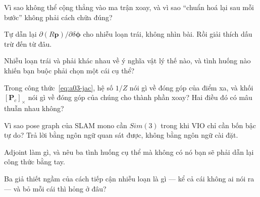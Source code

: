 \documentclass[../../vslam.tex]{subfiles}
\begin{document}
\begin{tukiem}
\item Vì sao không thể cộng thẳng vào ma trận xoay, và vì sao ``chuẩn hoá lại sau mỗi bước'' không phải cách chữa đúng?
\item Tự dẫn lại \(\partial(R\mathbf{p})/\partial\delta\boldsymbol{\phi}\) cho nhiễu loạn trái, không nhìn bài. Rồi giải thích dấu trừ đến từ đâu.
\item Nhiễu loạn trái và phải khác nhau về ý nghĩa vật lý thế nào, và tình huống nào khiến bạn buộc phải chọn một cái cụ thể?
\item Trong công thức~\eqref{eq:a03-jac}, hệ số \(1/Z\) nói gì về đóng góp của điểm xa, và khối \([\mathbf{P}_c]_\times\) nói gì về đóng góp của chúng cho thành phần xoay? Hai điều đó có mâu thuẫn nhau không?
\item Vì sao pose graph của SLAM mono cần \(Sim(3)\) trong khi VIO chỉ cần bốn bậc tự do? Trả lời bằng ngôn ngữ quan sát được, không bằng ngôn ngữ cài đặt.
\item Adjoint làm gì, và nêu ba tình huống cụ thể mà không có nó bạn sẽ phải dẫn lại công thức bằng tay.
\item Ba giả thiết ngầm của cách tiếp cận nhiễu loạn là gì --- kể cả cái không ai nói ra --- và bỏ mỗi cái thì hỏng ở đâu?
\end{tukiem}
\ifSubfilesClassLoaded{\printbibliography[title={Nguồn}]}{}
\end{document}
